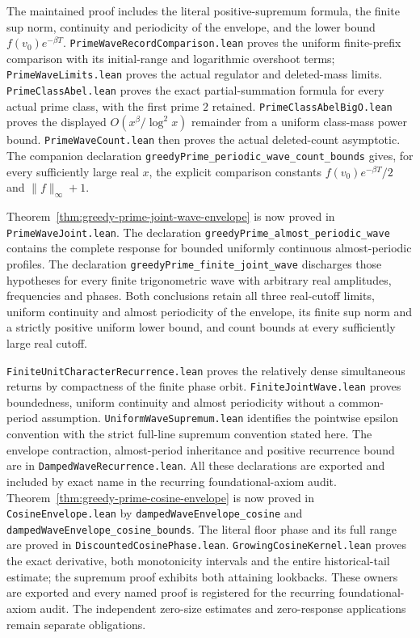 \documentclass[11pt]{article}
\theoremstyle{definition}
\begin{document}
The maintained proof includes the literal positive-supremum formula,
the finite sup norm, continuity and periodicity of the envelope, and
the lower bound $f(v_0)e^{-\beta T}$.
\texttt{PrimeWaveRecordComparison.lean} proves the uniform finite-prefix
comparison with its initial-range and logarithmic overshoot terms;
\texttt{PrimeWaveLimits.lean} proves the actual regulator and deleted-mass
limits.
\texttt{PrimeClassAbel.lean} proves the exact partial-summation formula
for every actual prime class, with the first prime $2$ retained.
\texttt{PrimeClassAbelBigO.lean} proves the displayed
$O(x^\beta/\log^2x)$ remainder from a uniform class-mass power bound.
\texttt{PrimeWaveCount.lean} then proves the actual deleted-count
asymptotic.
The companion declaration
\texttt{greedyPrime\_periodic\_wave\_count\_bounds} gives, for every
sufficiently large real $x$, the explicit comparison constants
$f(v_0)e^{-\beta T}/2$ and $\|f\|_\infty+1$.

Theorem~\ref{thm:greedy-prime-joint-wave-envelope} is now proved in
\texttt{PrimeWaveJoint.lean}.
The declaration
\texttt{greedyPrime\_\allowbreak almost\_\allowbreak periodic\_\allowbreak wave}
contains the complete response for bounded uniformly continuous
almost-periodic profiles.
The declaration
\texttt{greedyPrime\_\allowbreak finite\_\allowbreak joint\_\allowbreak wave}
discharges those hypotheses for every finite trigonometric wave with
arbitrary real amplitudes, frequencies and phases.
Both conclusions retain all three real-cutoff limits, uniform continuity
and almost periodicity of the envelope, its finite sup norm and a strictly
positive uniform lower bound, and count bounds at every sufficiently
large real cutoff.

\texttt{FiniteUnitCharacterRecurrence.lean} proves the relatively dense
simultaneous returns by compactness of the finite phase orbit.
\texttt{FiniteJointWave.lean} proves boundedness, uniform continuity
and almost periodicity without a common-period assumption.
\texttt{UniformWaveSupremum.lean} identifies the pointwise epsilon
convention with the strict full-line supremum convention stated here.
The envelope contraction, almost-period inheritance and positive
recurrence bound are in \texttt{DampedWaveRecurrence.lean}.
All these declarations are exported and included by exact name in
the recurring foundational-axiom audit.
Theorem~\ref{thm:greedy-prime-cosine-envelope} is now proved in
\texttt{CosineEnvelope.lean} by
\texttt{dampedWaveEnvelope\_\allowbreak cosine} and
\texttt{dampedWaveEnvelope\_\allowbreak cosine\_\allowbreak bounds}.
The literal floor phase and its full range are proved in
\texttt{DiscountedCosinePhase.lean}.
\texttt{GrowingCosineKernel.lean} proves the exact derivative,
both monotonicity intervals and the entire historical-tail estimate;
the supremum proof exhibits both attaining lookbacks.
These owners are exported and every named proof is registered for
the recurring foundational-axiom audit.
The independent zero-size estimates and zero-response applications
remain separate obligations.
\end{document}
